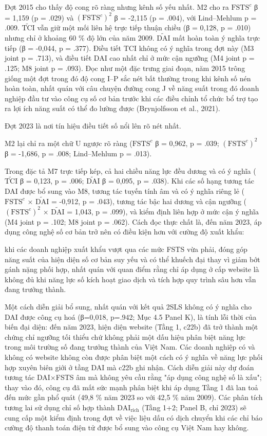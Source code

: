 \documentclass[12pt,a4paper]{article}
\begin{document}
Đợt 2015 cho thấy độ cong rõ ràng nhưng kênh số yếu nhất. M2 cho ra
\(\mathrm{FSTS}^{c}\) β = 1,159 (p = .029) và \((\mathrm{FSTS}^{c})^2\)
β = -2,115 (p = .004), với Lind--Mehlum p = .009.
\(\tilde{\mathrm{TCI}}\) vẫn giữ một mối liên hệ trực tiếp thuận chiều
(β = 0,128, p = .010) nhưng chỉ ở khoảng 60 \% độ lớn của năm 2009.
\(\tilde{\mathrm{DAI}}\) mất hoàn toàn ý nghĩa trực tiếp (β = -0,044, p
= .377). Điều tiết TCI không có ý nghĩa trong đợt này (M3 joint p =
.713), và điều tiết DAI cao nhất chỉ ở mức cận ngưỡng (M4 joint p =
.125; M8 joint p = .093). Đọc như một đặc trưng giai đoạn, năm 2015
trông giống một đợt trong đó độ cong I--P sắc nét bất thường trong khi
kênh số nén hoàn toàn, nhất quán với câu chuyện đường cong J về năng
suất trong đó doanh nghiệp đầu tư vào công cụ số cơ bản trước khi các
điều chỉnh tổ chức bổ trợ tạo ra lợi ích năng suất có thể đo lường được
(Brynjolfsson et al., 2021).

Đợt 2023 là nơi tín hiệu điều tiết số nổi lên rõ nét nhất.

M2 lại chỉ ra một chữ U ngược rõ ràng (\(\mathrm{FSTS}^{c}\) β = 0,962,
p = .039; \((\mathrm{FSTS}^{c})^2\) β = -1,686, p = .008; Lind--Mehlum p
= .013).

Trong đặc tả M7 trực tiếp kép, cả hai chiều năng lực đều dương và có ý
nghĩa (\(\tilde{\mathrm{TCI}}\) β = 0,123, p = .006;
\(\tilde{\mathrm{DAI}}\) β = 0,095, p = .038). Khi các số hạng tương tác
DAI được bổ sung vào M8, tương tác tuyến tính âm và có ý nghĩa riêng lẻ
(\(\mathrm{FSTS}^{c}\) × \(\tilde{\mathrm{DAI}}\) = -0,912, p = .043),
tương tác bậc hai dương và cận ngưỡng (\((\mathrm{FSTS}^{c})^2\) ×
\(\tilde{\mathrm{DAI}}\) = 1,043, p = .099), và kiểm định liên hợp ở mức
cận ý nghĩa (M4 joint p = .102; M8 joint p = .062). Cách đọc thực chất
là, đến năm 2023, áp dụng công nghệ số cơ bản trở nên có điều kiện hơn
với cường độ xuất khẩu:

khi các doanh nghiệp xuất khẩu vượt qua các mức FSTS vừa phải, đóng góp
năng suất của hiện diện số cơ bản suy yếu và có thể khuếch đại thay vì
giảm bớt gánh nặng phối hợp, nhất quán với quan điểm rằng chỉ áp dụng ở
cấp website là không đủ khi năng lực số kích hoạt giao dịch và tích hợp
quy trình sâu hơn vẫn đang trưởng thành.

Một cách diễn giải bổ sung, nhất quán với kết quả 2SLS không có ý nghĩa
cho DAI được công cụ hoá (β=0,018, p=.942; Mục 4.5 Panel K), là tính lỗi
thời của biến đại diện: đến năm 2023, hiện diện website (Tầng 1, c22b)
đã trở thành một chứng chỉ ngưỡng tối thiểu chứ không phải một dấu hiệu
phân biệt năng lực trong môi trường số đang trưởng thành của Việt Nam.
Các doanh nghiệp có và không có website không còn được phân biệt một
cách có ý nghĩa về năng lực phối hợp xuyên biên giới ở tầng DAI mà c22b
ghi nhận. Cách diễn giải này dự đoán tương tác DAI×FSTS âm mà không yêu
cầu rằng "áp dụng công nghệ số là xấu"; thay vào đó, công cụ đã mất sức
mạnh phân biệt khi áp dụng Tầng 1 đã lan toả đến mức gần phổ quát (49,8
\% năm 2023 so với 42,5 \% năm 2009). Các phân tích tương lai sử dụng
chỉ số hợp thành \(\mathrm{DAI}_{\text{rich}}\) (Tầng 1+2; Panel B, chỉ
2023) sẽ cung cấp một kiểm định trong đợt về việc liệu dấu có dịch
chuyển khi các chỉ báo cường độ thanh toán điện tử được bổ sung vào công
cụ Việt Nam hay không.
\end{document}
